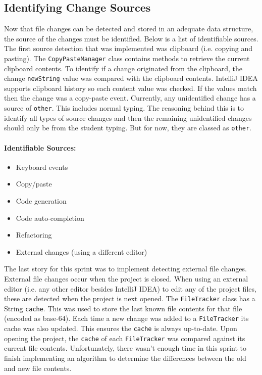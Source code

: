 \subsection{Identifying Change Sources}
Now that file changes can be detected and stored in an adequate data structure, the source of the changes must be identified. Below is a list of identifiable sources. The first source detection that was implemented was clipboard (i.e. copying and pasting). The \texttt{CopyPasteManager} class contains methods to retrieve the current clipboard contents. To identify if a change originated from the clipboard, the change \texttt{newString} value was compared with the clipboard contents. IntelliJ IDEA supports clipboard history so each content value was checked. If the values match then the change was a copy-paste event. Currently, any unidentified change has a source of \texttt{other}. This includes normal typing. The reasoning behind this is to identify all types of source changes and then the remaining unidentified changes should only be from the student typing. But for now, they are classed as \texttt{other}.

\paragraph{Identifiable Sources:}
\begin{itemize}
  \item Keyboard events
  \item Copy/paste
  \item Code generation
  \item Code auto-completion
  \item Refactoring
  \item External changes (using a different editor)
\end{itemize}

The last story for this sprint was to implement detecting external file changes. External file changes occur when the project is closed. When using an external editor (i.e. any other editor besides IntelliJ IDEA) to edit any of the project files, these are detected when the project is next opened. The \texttt{FileTracker} class has a String \texttt{cache}. This was used to store the last known file contents for that file (encoded as base-64). Each time a new change was added to a \texttt{FileTracker} its cache was also updated. This ensures the \texttt{cache} is always up-to-date. Upon opening the project, the \texttt{cache} of each \texttt{FileTracker} was compared against its current file contents. Unfortunately, there wasn't enough time in this sprint to finish implementing an algorithm to determine the differences between the old and new file contents.


